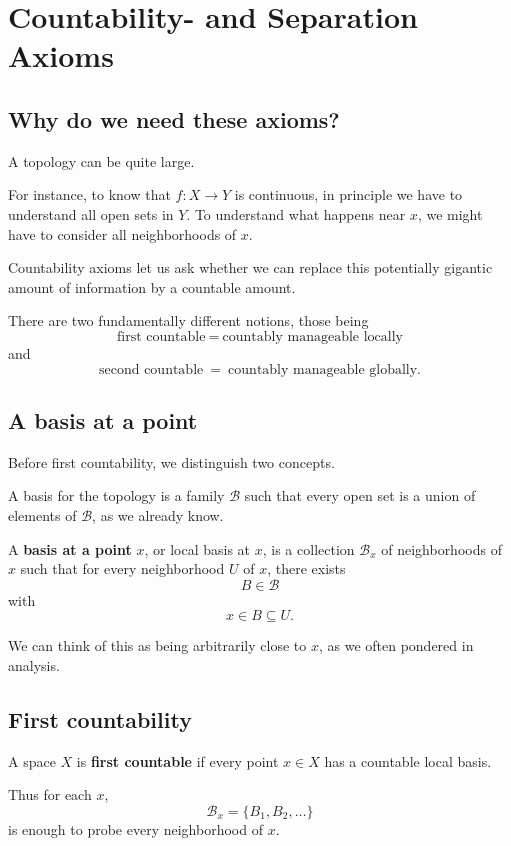 \documentclass[11pt]{article}
\begin{document}
\section{Countability- and Separation Axioms}

\subsection{Why do we need these axioms?}

A topology can be quite large. 

For instance, to know that $f : X \to Y$ is continuous, 
in principle we have to understand all open sets in $Y$. 
To understand what happens near $x$, we might 
have to consider all neighborhoods of $x$. 

Countability axioms let us ask whether 
we can replace this potentially gigantic amount of 
information by a countable amount. 

There are two fundamentally different notions, those 
being 
\[
    \text{first countable} \ = \ \text{countably 
    manageable locally}
\]
and 
\[
    \text{second countable} \ = \ \text{countably 
    manageable globally}. 
\]

\subsection{A basis at a point}
Before first countability, we distinguish two 
concepts. 

A basis for the topology is a family $\mathcal B$ 
such that every open set is a union of 
elements of $\mathcal B$, as we already know. 

A \textbf{basis at a point} $x$, or local basis 
at $x$, is a collection $\mathcal B_x$ of neighborhoods 
of $x$ such that for every neighborhood $U$ of $x$, there 
exists 
\[
    B \in \mathcal B 
\]
with 
\[
    x \in B \subseteq U. 
\]

We can think of this as being arbitrarily close to 
$x$, as we often pondered in analysis. 

\subsection{First countability}

A space $X$ is \textbf{first countable} 
if every point $x \in X$ has a countable local basis. 

Thus for each $x$, 
\[
    \mathcal B_x = \{B_1,B_2,\ldots\}
\]
is enough to probe every neighborhood of $x$. 
\end{document}
